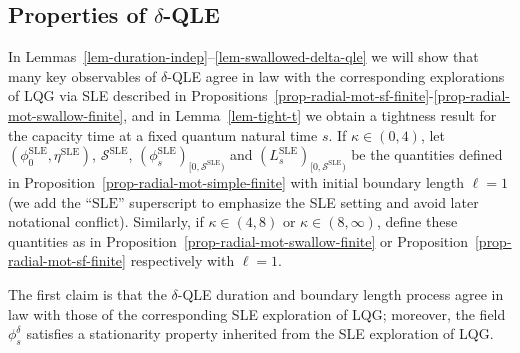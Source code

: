 \documentclass[a4paper]{article}
\numberwithin{equation}{section}
\newcommand{\qduration}{\mathcal{S}}
\newcommand{\SLE}{\mathrm{SLE}}
\theoremstyle{remark}
\numberwithin{equation}{section}
\begin{document}
\subsection{Properties of $\delta$-QLE}\label{subsec-properties-delta-qle}
In Lemmas~\ref{lem-duration-indep}--\ref{lem-swallowed-delta-qle} we will show that many key observables of $\delta$-QLE agree in law with the corresponding explorations of LQG via SLE described in Propositions~\ref{prop-radial-mot-sf-finite}-\ref{prop-radial-mot-swallow-finite}, and in Lemma~\ref{lem-tight-t} we obtain a tightness result for the capacity time at a fixed quantum natural time $s$. 
If $\kappa \in (0,4)$, let $(\phi_0^\SLE, \eta^\SLE)$, $\qduration^\SLE$, $(\phi_s^\SLE)_{[0,\qduration^\SLE)}$ and $(L_s^\SLE)_{[0,\qduration^\SLE)}$ be the quantities defined in Proposition~\ref{prop-radial-mot-simple-finite} with initial boundary length $\ell = 1$ (we add the ``$\SLE$'' superscript to emphasize the SLE setting and avoid later notational conflict). Similarly, if $\kappa \in (4,8)$ or $\kappa \in (8,\infty)$, define these quantities as in Proposition~\ref{prop-radial-mot-swallow-finite} or Proposition~\ref{prop-radial-mot-sf-finite} respectively with $\ell = 1$. 

The first claim is that the $\delta$-QLE duration and boundary length process agree in law with those of the corresponding SLE exploration of LQG; moreover, the field $\phi^\delta_s$ satisfies a stationarity property inherited from the SLE exploration of LQG. 
\end{document}
